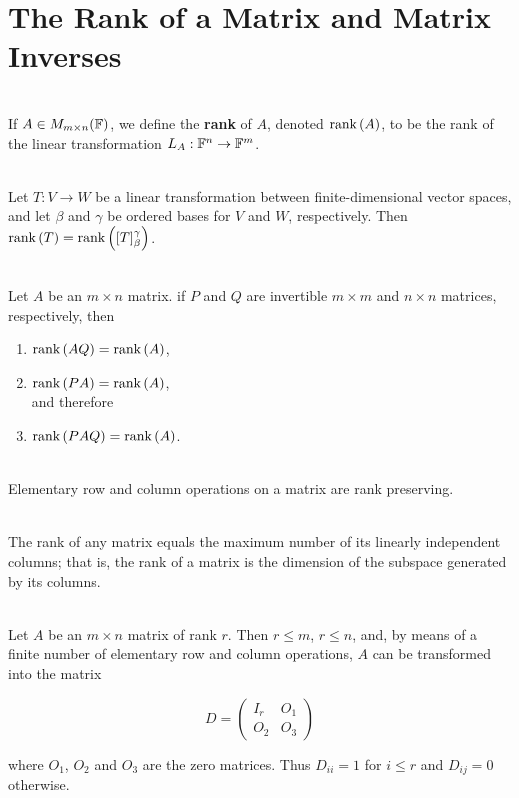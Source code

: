 \section{The Rank of a Matrix and Matrix Inverses}

\begin{definition}
	\hfill\\
	If $A \in M_{m \times n}(\mathbb{F})$, we define the \textbf{rank} of $A$, denoted $\text{rank}\left(A\right)$, to be the rank of the linear transformation $L_A: \mathbb{F}^n \to \mathbb{F}^m$.
\end{definition}

\begin{theorem}
	\hfill\\
	Let $T: V \to W$ be a linear transformation between finite-dimensional vector spaces, and let $\beta$ and $\gamma$ be ordered bases for $V$ and $W$, respectively. Then $\text{rank}\left(T\right) = \text{rank}\left([T]_\beta^\gamma\right)$.
\end{theorem}

\begin{theorem}
	\hfill\\
	Let $A$ be an $m \times n$ matrix. if $P$ and $Q$ are invertible $m \times m$ and $n \times n$ matrices, respectively, then
	
	\begin{enumerate}
		\item $\text{rank}\left(AQ\right) = \text{rank}\left(A\right)$,
		\item $\text{rank}\left(PA\right) = \text{rank}\left(A\right)$,\\ and therefore
		\item $\text{rank}\left(PAQ\right) = \text{rank}\left(A\right)$.
	\end{enumerate}
\end{theorem}

\begin{corollary}
	\hfill\\
	Elementary row and column operations on a matrix are rank preserving.
\end{corollary}

\begin{theorem}
	\hfill\\
	The rank of any matrix equals the maximum number of its linearly independent columns; that is, the rank of a matrix is the dimension of the subspace generated by its columns.
\end{theorem}

\begin{theorem}
	\hfill\\
	Let $A$ be an $m \times n$ matrix of rank $r$. Then $r \leq m$, $r \leq n$, and, by means of a finite number of elementary row and column operations, $A$ can be transformed into the matrix
	
	\[D = \begin{pmatrix}
		I_r & O_1 \\
		O_2 & O_3
	\end{pmatrix}\]
	
	where $O_1$, $O_2$ and $O_3$ are the zero matrices. Thus $D_{ii} = 1$ for $i \leq r$ and $D_{ij} = 0$ otherwise.
\end{theorem}

